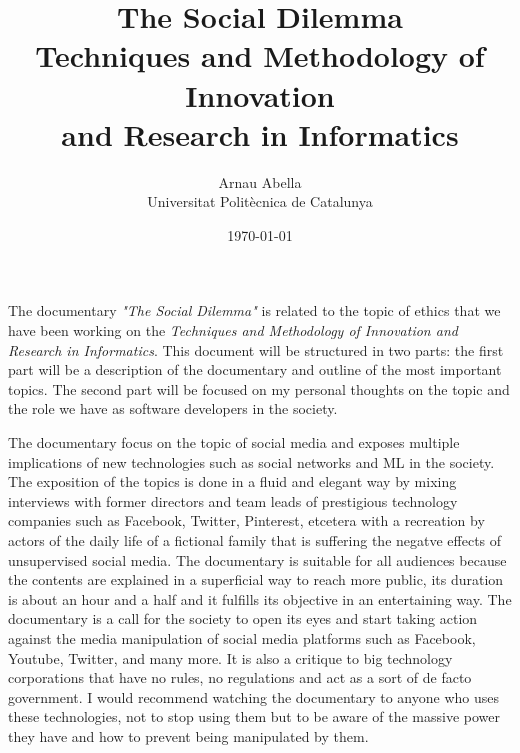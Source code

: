 \documentclass[12pt, a4paper]{article}
\title{%
  \vspace{-10ex}
  The Social Dilemma\\
  \vspace{2ex}
  \large{Techniques and Methodology of Innovation \\and Research in Informatics}
}
\author{
  Arnau Abella\\
  \small{Universitat Polit\`ecnica de Catalunya}
}
\date{\today}
\begin{document}
\maketitle

\vspace{5ex}

The documentary \textit{"The Social Dilemma"} is related to the topic of ethics that we have been working on the \textit{Techniques and Methodology of Innovation and Research in Informatics}. This document will be structured in two parts: the first part will be a description of the documentary and outline of the most important topics. The second part will be focused on my personal thoughts on the topic and the role we have as software developers in the society.

The documentary focus on the topic of social media and exposes multiple implications of new technologies such as social networks and ML in the society. The exposition of the topics is done in a fluid and elegant way by mixing interviews with former directors and team leads of prestigious technology companies such as Facebook, Twitter, Pinterest, etcetera with a recreation by actors of the daily life of a fictional family that is suffering the negatve effects of unsupervised social media. The documentary is suitable for all audiences because the contents are explained in a superficial way to reach more public, its duration is about an hour and a half and it fulfills its objective in an entertaining way. The documentary is a call for the society to open its eyes and start taking action against the media manipulation of social media platforms such as Facebook, Youtube, Twitter, and many more. It is also a critique to big technology corporations that have no rules, no regulations and act as a sort of de facto government. I would recommend watching the documentary to anyone who uses these technologies, not to stop using them but to be aware of the massive power they have and how to prevent being manipulated by them.
\end{document}
